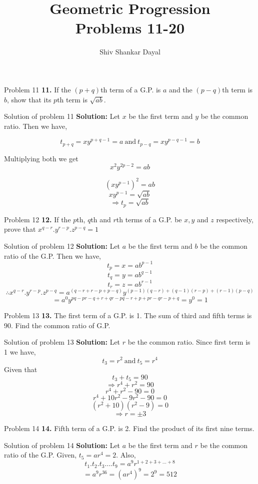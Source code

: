 \documentclass[aspectratio=1610,8pt]{beamer}
\title{Geometric Progression\\Problems 11-20}
\author[Shiv Shankar Dayal]{Shiv Shankar Dayal}
\begin{document}
\begin{frame}
       \titlepage
\end{frame}
\begin{frame}{Problem 11}
  \textbf{11.} If the $(p + q)$th term of a G.P. is $a$ and the $(p - q)$th
  term is $b$, show that its $p$th term is $\sqrt{ab}$.
\end{frame}
\begin{frame}{Solution of problem 11}
  \textbf{Solution:} Let $x$ be the first term and $y$ be the common
  ratio. Then we have,

  $$t_{p + q} = xy^{p + q - 1} = a~\text{and}~t_{p - q} = xy^{p - q -1} = b$$

  Multiplying both we get $$x^2y^{2p - 2} = ab$$
  
  $$(xy^{p - 1})^2 = ab$$
  $$ xy^{p - 1} = \sqrt{ab}$$
  $$\Rightarrow t_p = \sqrt{ab}$$
\end{frame}
\begin{frame}{Problem 12}
  \textbf{12.} If the $p$th, $q$th and $r$th terms of a G.P. be $x, y$ and $z$
  respectively, prove that $x^{q - r}.y^{r - p}.z^{p - q} = 1$
\end{frame}
\begin{frame}{Solution of problem 12}
  \textbf{Solution:} Let $a$ be the first term and $b$ be the common ratio of
  the G.P. Then we have,
  $$t_p = x = ab^{p - 1}$$
  $$t_q = y = ab^{q - 1}$$
  $$t_r = z = ab^{r - 1}$$
  $$\therefore x^{q - r}.y^{r - p}.z^{p - q} = a^(q - r + r - p + p - q)y^{(p -
    1)(q - r) + (q - 1)(r - p) + (r - 1)(p - q)}$$
  $$= a^0y^{pq - pr - q + r + qr - pq -r + p + pr - qr -p + q} = y^0 = 1$$
\end{frame}
\begin{frame}{Problem 13}
  \textbf{13.} The first term of a G.P. is 1. The sum of third and fifth terms
  is 90. Find the common ratio of G.P.
\end{frame}
\begin{frame}{Solution of problem 13}
  \textbf{Solution:} Let $r$ be the common ratio. Since first term is 1 we
  have,
  $$t_3 = r^2~\text{and}~t_5 = r^4$$
  Given that $$t_3 + t_5 = 90$$
  $$\Rightarrow r^4 + r^2 = 90$$
  $$r^4 + r^2 - 90 = 0$$
  $$r^4 + 10r^2 - 9r^2 -90 = 0$$
  $$(r^2 + 10)(r^2 - 9) = 0$$
  $$\Rightarrow r = \pm 3$$
\end{frame}
\begin{frame}{Problem 14}
  \textbf{14.} Fifth term of a G.P. is 2. Find the product of its first nine
  terms.
\end{frame}
\begin{frame}{Solution of problem 14}
  \textbf{Solution:} Let $a$ be the first term and $r$ be the common ratio of
  the G.P. Given, $t_5 = ar^4 = 2$. Also,
  $$t_1.t_2.t_3\ldots .t_9 = a^9r^{1 + 2 + 3 + \ldots + 8}$$
  $$= a^9r^{36} = (ar^4)^9 = 2^9 = 512$$
\end{frame}
\end{document}
